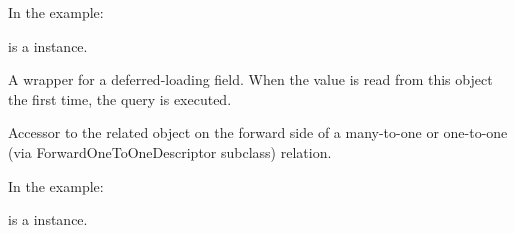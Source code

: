\documentclass[letterpaper,10pt,english]{sphinxmanual}
\begin{document}
\begin{fulllineitems}
\begin{fulllineitems}
In the example:

\begin{sphinxVerbatim}[commandchars=\\\{\}]
 
       
\end{sphinxVerbatim}

 is a  instance.

\end{fulllineitems}


\begin{fulllineitems}
\label{\detokenize{modules/models:gestion.models.HistoricalRefund.coopeman_id}}
A wrapper for a deferred-loading field. When the value is read from this
object the first time, the query is executed.

\end{fulllineitems}


\begin{fulllineitems}
\label{\detokenize{modules/models:gestion.models.HistoricalRefund.customer}}
Accessor to the related object on the forward side of a many-to-one or
one-to-one (via ForwardOneToOneDescriptor subclass) relation.

In the example:

\begin{sphinxVerbatim}[commandchars=\\\{\}]
 
       
\end{sphinxVerbatim}

 is a  instance.


\end{fulllineitems}
\end{fulllineitems}
\end{document}
